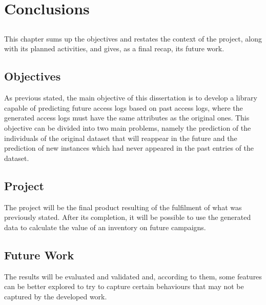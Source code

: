 \chapter{Conclusions}\label{chap:chap4}

\section*{}

This chapter sums up the objectives and restates the context of the project, along with its planned activities, and gives, as a final recap, its future work.

\section{Objectives}

As previous stated, the main objective of this dissertation is to develop a library capable of predicting future access logs based on past access logs,
where the generated access logs must have the same attributes as the original ones. This objective can be divided into two main problems, namely the
prediction of the individuals of the original dataset that will reappear in the future and the prediction of new instances which had never appeared
in the past entries of the dataset. 

\section{Project}

The project will be the final product resulting of the fulfilment of what was previously stated. After its completion, it will be possible to use the 
generated data to calculate the value of an inventory on future campaigns.

\section{Future Work}

The results will be evaluated and validated and, according to them, some features can be better explored to try to capture certain behaviours that may not be captured by the developed work.
